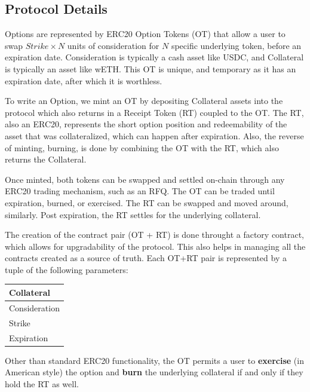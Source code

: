 \documentclass[%
 reprint,
 amsmath,amssymb,
 aps,
 prl,
floatfix,
]{revtex4-2}
\begin{document}
\subsection{Protocol Details}
Options are represented by ERC20 Option Tokens (OT) that allow a user to 
swap $Strike \times N$ units of consideration for $N$ specific underlying token, before an expiration date. 
Consideration is typically a cash asset like USDC, and Collateral is typically an asset like wETH.
This OT is unique, and temporary as it has an expiration date, after which it is worthless. 

To write an Option, we mint an OT by depositing Collateral assets into the protocol 
which also returns in a Receipt Token (RT) coupled to the OT. 
The RT, also an ERC20, represents the short option position and 
redeemability of the asset that was collateralized, which can happen after expiration.
Also, the reverse of minting, burning, is done by combining the OT with the RT, which also returns the Collateral.

Once minted, both tokens can be swapped and settled on-chain through any ERC20 trading mechanism, such as an RFQ.
The OT can be traded until expiration, burned, or exercised.
The RT can be swapped and moved around, similarly. 
Post expiration, the RT settles for the underlying collateral.

The creation of the contract pair (OT + RT) is done throught a factory contract, which allows for upgradability of the protocol. 
This also helps in managing all the contracts created as a source of truth.
Each OT+RT pair is represented by a tuple of the following parameters:

\begin{table}[ht]
\centering
\begin{tabular}{|p{2.5cm} |}
\hline
Collateral \\
\hline
Consideration \\
\hline
Strike \\
\hline
Expiration \\
\hline
\end{tabular}
\end{table}


Other than standard ERC20 functionality, the OT permits a user to \textbf{exercise} (in American style) the option and
\textbf{burn} the underlying collateral if and only if they hold the RT as well.
\end{document}
